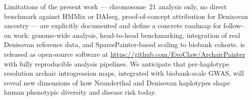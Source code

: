 Limitations of the present work --- chromosome~21 analysis only, no direct
benchmark against HMMix or DAIseg, proof-of-concept attribution for Denisovan
ancestry --- are explicitly documented and define a concrete roadmap for
follow-on work: genome-wide analysis, head-to-head benchmarking, integration of
real Denisovan reference data, and SparsePainter-based scaling to biobank cohorts.
\AP{} is released as open-source software at \url{https://github.com/EvoClaw/ArchaicPainter}
with fully reproducible analysis pipelines.
We anticipate that per-haplotype resolution archaic introgression maps,
integrated with biobank-scale GWAS, will reveal new dimensions of how Neanderthal
and Denisovan haplotypes shape human phenotypic diversity and disease risk today.
